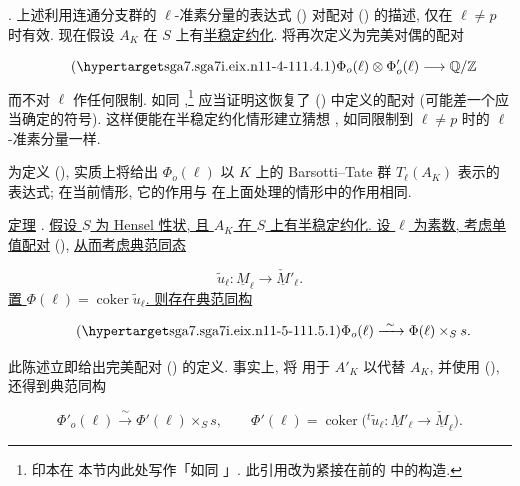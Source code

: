 \medskip
\noindent
{}. 上述利用连通分支群的 $\ell$-准素分量的表达式 () 对配对 () 的描述, 仅在 $\ell\ne p$ 时有效. 现在假设 $A_K$ 在 $S$ 上有\underline{半稳定约化}. 将再次定义为完美对偶的配对

\begin{equation}\tag{\SGARefTarget{sga7.sga7i.eix.n11-4-1}{11.4.1}}
\Phi_o(\ell)\otimes\Phi'_o(\ell)\longrightarrow\mathbb Q/\mathbb Z
\end{equation}
而不对 $\ell$ 作任何限制. 如同 ,\footnote{印本在  本节内此处写作「如同 」. 此引用改为紧接在前的  中的构造.} 应当证明这恢复了 () 中定义的配对 (可能差一个应当确定的符号). 这样便能在半稳定约化情形建立猜想 , 如同限制到 $\ell\ne p$ 时的 $\ell$-准素分量一样.

为定义 (), 实质上将给出 $\Phi_o(\ell)$ 以 $K$ 上的 Barsotti--Tate 群 $T_\ell(A_K)$ 表示的表达式; 在当前情形, 它的作用与  在上面处理的情形中的作用相同.

\medskip
\noindent
\underline{定理} . \underline{假设 $S$ 为 Hensel 性状, 且 $A_K$ 在 $S$ 上有半稳定约化. 设 $\ell$ 为素数, 考虑单值配对} (), \underline{从而考虑典范同态}

\begin{equation*}
\widetilde u_\ell:\underline M_\ell
 \longrightarrow\underline{\check M}'_\ell.
\end{equation*}
\underline{置 $\Phi(\ell)=\operatorname{coker}\widetilde u_\ell$. 则存在典范同构}

\begin{equation}\tag{\SGARefTarget{sga7.sga7i.eix.n11-5-1}{11.5.1}}
\Phi_o(\ell)\xrightarrow{\ \sim\ }\Phi(\ell)\times_S s.
\end{equation}

此陈述立即给出完美配对 () 的定义. 事实上, 将  用于 $A'_K$ 以代替 $A_K$, 并使用 (), 还得到典范同构

\begin{equation*}
\Phi'_o(\ell)\xrightarrow{\ \sim\ }\Phi'(\ell)\times_S s,
\qquad
\Phi'(\ell)=\operatorname{coker}\bigl(
 {}^t\!\widetilde u_\ell:\underline M'_\ell
 \longrightarrow\underline{\check M}_\ell\bigr).
\end{equation*}

